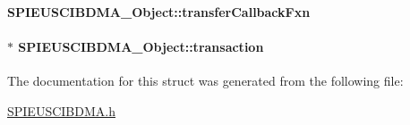 \paragraph[{transfer\-Callback\-Fxn}]{ S\-P\-I\-E\-U\-S\-C\-I\-B\-D\-M\-A\-\_\-\-Object\-::transfer\-Callback\-Fxn}\label{struct_s_p_i_e_u_s_c_i_b_d_m_a___object_a1a5d8467541e90687b6c9034e45dfe75}
\paragraph[{transaction}]{$\ast$ S\-P\-I\-E\-U\-S\-C\-I\-B\-D\-M\-A\-\_\-\-Object\-::transaction}\label{struct_s_p_i_e_u_s_c_i_b_d_m_a___object_a4b218a6096bec10cc51eeb6597ac9f8c}


The documentation for this struct was generated from the following file\-:\begin{DoxyCompactItemize}
\item 
\hyperlink{_s_p_i_e_u_s_c_i_b_d_m_a_8h}{S\-P\-I\-E\-U\-S\-C\-I\-B\-D\-M\-A.\-h}\end{DoxyCompactItemize}
